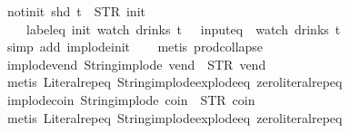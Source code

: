 \begin{isabellebody}
\endisatagproof
{\isafoldproof}%
%
\isadelimproof
\isanewline
%
\endisadelimproof
\isanewline
{}\isamarkupfalse%
\ not{\isacharunderscore}init{\isacharcolon}\ {\isachardoublequoteopen}shd\ t\ {\isasymnoteq}\ {\isacharparenleft}STR\ {\isacharprime}{\isacharprime}init{\isacharprime}{\isacharprime}{\isacharcomma}\ {\isacharbrackleft}{\isacharbrackright}{\isacharparenright}\ {\isasymLongrightarrow}\isanewline
\ \ \ \ label{\isacharunderscore}eq\ {\isacharprime}{\isacharprime}init{\isacharprime}{\isacharprime}\ {\isacharparenleft}watch\ drinks\ t{\isacharparenright}\ {\isasymLongrightarrow}\ {\isasymnot}\ input{\isacharunderscore}eq\ {\isacharbrackleft}{\isacharbrackright}\ {\isacharparenleft}watch\ drinks\ t{\isacharparenright}{\isachardoublequoteclose}\isanewline
%
\isadelimproof
\ \ %
\endisadelimproof
%
\isatagproof
{}\isamarkupfalse%
\ {\isacharparenleft}simp\ add{\isacharcolon}\ implode{\isacharunderscore}init{\isacharparenright}\isanewline
\ \ \isamarkupfalse%
\ {\isacharparenleft}metis\ prod{\isachardot}collapse{\isacharparenright}%
\endisatagproof
{\isafoldproof}%
%
\isadelimproof
\isanewline
%
\endisadelimproof
\isanewline
{}\isamarkupfalse%
\ implode{\isacharunderscore}vend{\isacharcolon}\ {\isachardoublequoteopen}String{\isachardot}implode\ {\isacharprime}{\isacharprime}vend{\isacharprime}{\isacharprime}\ {\isacharequal}\ STR\ {\isacharprime}{\isacharprime}vend{\isacharprime}{\isacharprime}{\isachardoublequoteclose}\isanewline
%
\isadelimproof
\ \ %
\endisadelimproof
%
\isatagproof
{}\isamarkupfalse%
\ {\isacharparenleft}metis\ Literal{\isachardot}rep{\isacharunderscore}eq\ String{\isachardot}implode{\isacharunderscore}explode{\isacharunderscore}eq\ zero{\isacharunderscore}literal{\isachardot}rep{\isacharunderscore}eq{\isacharparenright}%
\endisatagproof
{\isafoldproof}%
%
\isadelimproof
\isanewline
%
\endisadelimproof
\isanewline
{}\isamarkupfalse%
\ implode{\isacharunderscore}coin{\isacharcolon}\ {\isachardoublequoteopen}String{\isachardot}implode\ {\isacharprime}{\isacharprime}coin{\isacharprime}{\isacharprime}\ {\isacharequal}\ STR\ {\isacharprime}{\isacharprime}coin{\isacharprime}{\isacharprime}{\isachardoublequoteclose}\isanewline
%
\isadelimproof
\ \ %
\endisadelimproof
%
\isatagproof
{}\isamarkupfalse%
\ {\isacharparenleft}metis\ Literal{\isachardot}rep{\isacharunderscore}eq\ String{\isachardot}implode{\isacharunderscore}explode{\isacharunderscore}eq\ zero{\isacharunderscore}literal{\isachardot}rep{\isacharunderscore}eq{\isacharparenright}%

\end{isabellebody}
